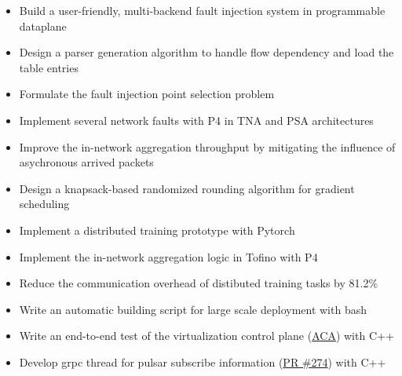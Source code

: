 \documentclass{resume}
\begin{document}
\begin{itemize}
  \item Build a user-friendly, multi-backend fault injection system in programmable dataplane
  \item Design a parser generation algorithm to handle flow dependency and load the table entries
  \item Formulate the fault injection point selection problem
  \item Implement several network faults with P4 in TNA and PSA architectures
\end{itemize}

\begin{itemize}
  \item Improve the in-network aggregation throughput by mitigating the influence of asychronous arrived packets
  \item Design a knapsack-based randomized rounding algorithm for gradient scheduling
  \item Implement a distributed training prototype with Pytorch 
  \item Implement the in-network aggregation logic in Tofino with P4
  \item Reduce the communication overhead of distibuted training tasks by 81.2\%
\end{itemize}

\begin{itemize}
  \item Write an automatic building script for large scale deployment with bash
  \item Write an end-to-end test of the virtualization control plane (\href{https://github.com/futurewei-cloud/alcor-control-agent}{ACA}) with C++
  \item Develop grpc thread for pulsar subscribe information (\href{https://github.com/futurewei-cloud/alcor-control-agent/pull/274}{PR \#274}) with C++
\end{itemize}
\end{document}
